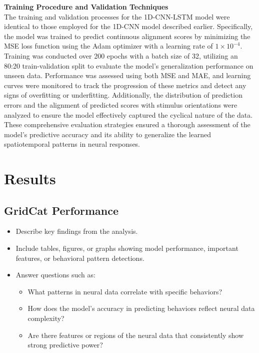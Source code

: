 \documentclass[a4paper]{article}
\begin{document}
\noindent \textbf{Training Procedure and Validation Techniques}\\
The training and validation processes for the 1D-CNN-LSTM model were identical to those employed for the 1D-CNN model described earlier. Specifically, the model was trained to predict continuous alignment scores by minimizing the MSE loss function using the Adam optimizer with a learning rate of \(1 \times 10^{-4}\). Training was conducted over 200 epochs with a batch size of 32, utilizing an 80:20 train-validation split to evaluate the model's generalization performance on unseen data. Performance was assessed using both MSE and MAE, and learning curves were monitored to track the progression of these metrics and detect any signs of overfitting or underfitting. Additionally, the distribution of prediction errors and the alignment of predicted scores with stimulus orientations were analyzed to ensure the model effectively captured the cyclical nature of the data. These comprehensive evaluation strategies ensured a thorough assessment of the model's predictive accuracy and its ability to generalize the learned spatiotemporal patterns in neural responses.


\section{Results}

\subsection{\textbf{GridCat Performance}}
\label{sec:results}
    \begin{itemize}
        \item Describe key findings from the analysis.
        \item Include tables, figures, or graphs showing model performance, important features, or behavioral pattern detections.
    \end{itemize}


    \begin{itemize}
        \item Answer questions such as:
            \begin{itemize}
                \item What patterns in neural data correlate with specific behaviors?
                \item How does the model’s accuracy in predicting behaviors reflect neural data complexity?
                \item Are there features or regions of the neural data that consistently show strong predictive power?
            \end{itemize}
    \end{itemize}
\end{document}
